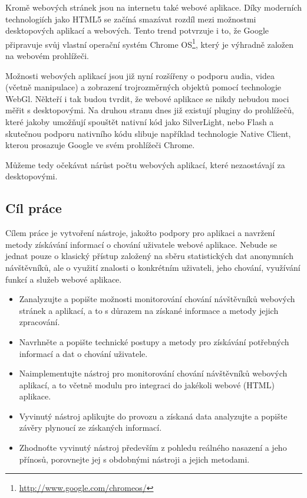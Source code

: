 \documentclass[bc,male,java,dept456]{diploma}						%
\begin{document}
Kromě webových stránek jsou na internetu také webové aplikace. Díky moderních technologiích jako HTML5 se začíná smazávat rozdíl mezi možnostmi desktopových aplikací a webových. Tento trend potvrzuje i to, že Google připravuje svůj vlastní operační systém Chrome OS\footnote{\url{http://www.google.com/chromeos/}}, který je výhradně založen na webovém prohlížeči.

Možnosti webových aplikací jsou již nyní rozšířeny o podporu audia, videa (včetně manipulace) a zobrazení trojrozměrných objektů pomocí technologie WebGl\cite{webgl}. Někteří i tak budou tvrdit, že webové aplikace se nikdy nebudou moci měřit s desktopovými. Na druhou stranu dnes již existují pluginy do prohlížečů, které jakoby umožňují spouštět nativní kód jako SilverLight, nebo Flash a skutečnou podporu nativního kódu slibuje například technologie Native Client, kterou prosazuje Google ve svém prohlížeči Chrome.

Můžeme tedy očekávat nárůst počtu webových a\-pli\-ka\-cí, které nezaostávají za desktopovými. 


\subsection{Cíl práce}

Cílem práce je vytvoření nástroje, jakožto podpory pro aplikaci a navržení metody zí\-ská\-vá\-ní informací o chování uživatele webové aplikace. Nebude se jednat pouze o klasický přístup založený na sběru statistických dat anonymních návštěvníků, ale o využití znalosti o konkrétním uživateli, jeho chování, využívání funkcí a služeb webové aplikace.

\begin{itemize}
	\item Zanalyzujte a popište možnosti monitorování chování návštěvníků webových strá\-nek a aplikací, a to s důrazem na získané informace a metody jejich zpracování.
	\item Navrhněte a popište technické postupy a metody pro získávání potřebných informací a dat o chování uživatele.
	\item Naimplementujte nástroj pro monitorování chování návštěvníků webových aplikací, a to včetně modulu pro integraci do jakékoli webové (HTML) aplikace.
	\item Vyvinutý nástroj aplikujte do provozu a získaná data analyzujte a popište závěry plynoucí ze získaných informací.
	\item Zhodnoťte vyvinutý nástroj především z pohledu reálného nasazení a jeho přínosů, porovnejte jej s obdobnými nástroji a jejich metodami.
\end{itemize}
\end{document}
